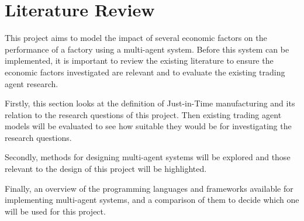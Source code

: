 \section{Literature Review}

This project aims to model the impact of several economic factors on the performance of a factory using a multi-agent system.
Before this system can be implemented, it is important to review the existing literature to ensure the economic factors investigated are relevant and to evaluate the existing trading agent research.

Firstly, this section looks at the definition of Just-in-Time manufacturing and its relation to the research questions of this project.
Then existing trading agent models will be evaluated to see how suitable they would be for investigating the research questions.

Secondly, methods for designing multi-agent systems will be explored and those relevant to the design of this project will be highlighted.

Finally, an overview of the programming languages and frameworks available for implementing multi-agent systems, and a comparison of them to decide which one will be used for this project.






